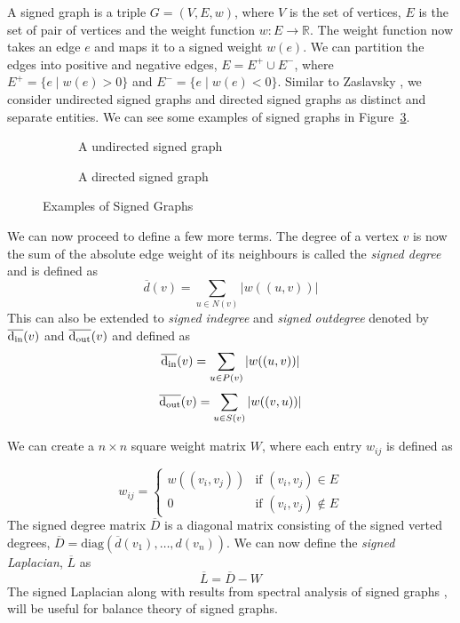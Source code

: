 A signed graph is a triple $G=(V,E,w)$, where $V$ is the set of vertices, $E$ is the set of pair of vertices and the weight function $w:E \rightarrow \mathbb{R}$. The weight function now takes an edge $e$ and maps it to a signed weight $w(e)$. We can partition the edges into positive and negative edges, $E = E^{+}\cup E^{-}$, where $E^{+} = \{e \mid w(e)>0\}$ and $E^{-}=\{e \mid w(e)<0\}$. Similar to Zaslavsky \cite{zaslavsky1982signed}, we consider undirected signed graphs and directed signed graphs as distinct and separate entities. We can see some examples of signed graphs in Figure~\ref{fig:signed-graphs}.
\begin{figure}[!ht]
    \centering
    \begin{subfigure}{0.5\textwidth}
        \centering
        
        \caption{A undirected signed graph}
        \label{fig:signed-undirected}
    \end{subfigure}

    \begin{subfigure}{0.5\textwidth}
        \centering
        
        \caption{A directed signed graph}
        \label{fig:signed-directed graph}
    \end{subfigure}
    \caption{Examples of Signed Graphs}
    \label{fig:signed-graphs}
\end{figure}

We can now proceed to define a few more terms. The degree of a vertex $v$ is now the sum of the absolute edge weight of its neighbours is called the \textit{signed degree} and is defined as 
\[
    \overline{d}(v) = \sum_{u \in N(v)}|w((u,v))|
\] 
This can also be extended to \textit{signed indegree} and \textit{signed outdegree} denoted by $\overline{\operatorname*{d_{\text{in}}}}(v)$ and $\overline{\operatorname*{d_{\text{out}}}}(v)$ and defined as
\[
    \overline{\operatorname*{d_{\text{in}}}}(v)=\sum_{u \in P(v)}|w((u,v))|
\] 
\[
    \overline{\operatorname*{d_{\text{out}}}}(v)=\sum_{u \in S(v)}|w((v,u))|
\] 

We can create a $n \times n$ square weight matrix $W$, where each entry $w_{ij}$ is defined as 

\[ w_{ij} = 
\begin{cases}
    w((v_i,v_j)) & \text{if } (v_i,v_j) \in E \\
    0 & \text{if } (v_i,v_j) \notin E      
\end{cases}
\] 
The signed degree matrix $\overline{D}$ is a diagonal matrix consisting of the signed verted degrees, $\overline{D} = \text{diag}(\overline{d}(v_{1}),\dots,d(v_n))$. We can now define the \textit{signed Laplacian}, $\overline{L}$ as 
\[ \overline{L} = \overline{D} - W\]
The signed Laplacian along with results from spectral analysis of signed graphs \cite{hou2005bounds,kunegis2010spectral}, will be useful for balance theory of signed graphs. 

